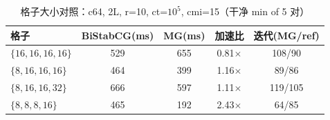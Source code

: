 \begin{table}[h]\centering
\begin{tabular}{lcccc}
\toprule
格子 & BiStabCG(ms) & MG(ms) & 加速比 & 迭代(MG/ref) \\
\midrule
$\{16,16,16,16\}$ & 529 & 655 & 0.81$\times$ & 108/90 \\
$\{8,16,16,16\}$ & 464 & 399 & 1.16$\times$ & 89/86 \\
$\{8,16,16,32\}$ & 666 & 597 & 1.11$\times$ & 119/105 \\
$\{8,8,8,16\}$ & 465 & 192 & 2.43$\times$ & 64/85 \\
\bottomrule
\end{tabular}
\caption{格子大小对照：c64, 2L, r=10, ct=$10^5$, cmi=15（干净 min of 5 对）}
\end{table}
